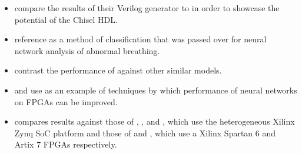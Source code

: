 \documentclass[12pt,letterpaper,english]{article}
\newcommand{\citework}[1]{\citeauthor{#1} \autocite{#1}}
\newcommand{\citeworks}[2]{%
	\citeauthor*{#1} \autocite{#1} and \citeauthor*{#2} \autocite{#2}%
}
\newcommand{\citemoreworks}[3]{%
	\citeauthor*{#1} \autocite{#1},
	\citeauthor*{#2} \autocite{#2}, and
	\citeauthor*{#3} \autocite{#3}%
}
\begin{document}
\begin{itemize}
	\item \citework{madineni2023parameterizable} compare the results of their
	Verilog generator to \autocite{main} in order to showcase the potential of
	the Chisel HDL.
	\item \citework{baedorf2023reverse} reference \autocite{main} as a method of
	classification that was passed over for neural network analysis of abnormal
	breathing.
	\item \citework{phipps2023pre} contrast the performance of \autocite{main}
	against other similar models.
	\item \citeworks{pistellato2023quantization}{yan2023end} use \autocite{main}
	as an example of techniques by which performance of neural networks on FPGAs
	can be improved.
	\item \citeauthor{main} compares results against those of
	\citemoreworks{yaozong2019design}{xiaokang2019design}{binfeng2019design},
	which use the heterogeneous Xilinx Zynq SoC platform and those of
	\citeworks{bingchen2019fpga}{hui2021convolutional},
	which use a Xilinx Spartan 6 and Artix 7 FPGAs respectively.
\end{itemize}


\newpage
\printbibliography
\end{document}
